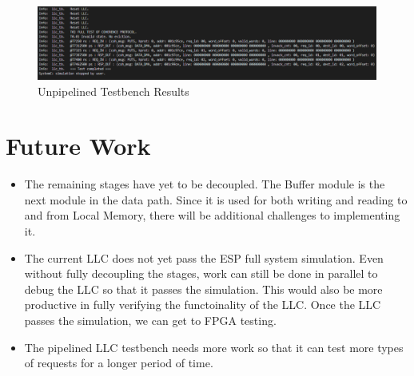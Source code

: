 \documentclass{sig-alternate}
\begin{document}
\begin{figure}[h]
  \centering
  \captionsetup{justification=centering, format=hang}
  \includegraphics[width=1\textwidth]{fig/puts_success.PNG}
  \caption{Unpipelined Testbench Results}
  \label{fig:puts}
  \end{figure}



\section{Future Work}
 \begin{itemize}
   \item The remaining stages have yet to be decoupled. The Buffer module is the next module in the data path. Since it is used for both writing and reading to and from Local Memory, there will be additional challenges
   to implementing it.
   \item The current LLC does not yet pass the ESP full system simulation. Even without fully decoupling the stages, work can still be done in parallel to debug the LLC so that it passes the simulation. 
   This would also be more productive in fully verifying the functoinality of the LLC. Once the LLC passes the simulation, we can get to FPGA testing.
   \item The pipelined LLC testbench needs more work so that it can test more types of requests for a longer period of time.
 \end{itemize}

{\small
%


}





\end{document}
